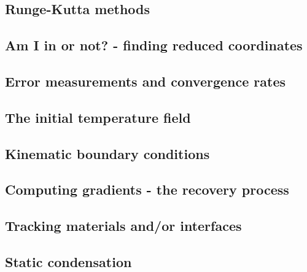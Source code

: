 \documentclass[a4paper]{article}
\begin{document}
\subsection{Runge-Kutta methods}  %
\newpage %
\subsection{Am I in or not? - finding reduced coordinates}\label{sec:amiin} %
\newpage %
\subsection{Error measurements and convergence rates}  %
\newpage %
\subsection{The initial temperature field}  %
\newpage %
\subsection{Kinematic boundary conditions}  %
\newpage %
\subsection{Computing gradients - the recovery process}  %
\newpage %
\subsection{Tracking materials and/or interfaces}  %
\newpage %
\subsection{Static condensation}  %
\newpage %
\end{document}

